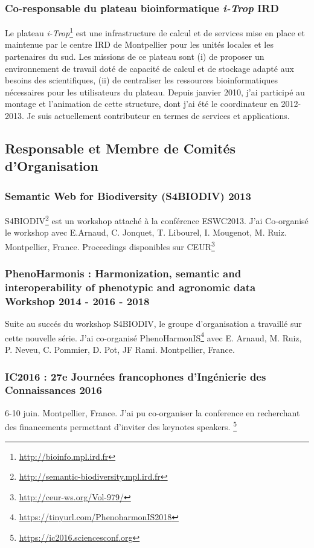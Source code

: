 \subsubsection*{Co-responsable du plateau bioinformatique \textit{i-Trop} IRD} 
Le plateau  \textit{i-Trop}\footnote{\url{http://bioinfo.mpl.ird.fr}} est une infrastructure de calcul et de services mise en place et maintenue par le centre IRD de Montpellier pour les unités locales et les partenaires du sud. Les missions de ce plateau sont (i) de proposer un environnement de travail doté de capacité de calcul et de stockage adapté aux besoins des scientifiques, (ii) de centraliser les ressources bioinformatiques nécessaires pour les utilisateurs du plateau. Depuis janvier 2010, j’ai participé au montage et l’animation de cette structure, dont j’ai été le coordinateur en 2012-2013. Je suis actuellement contributeur en termes de services et applications.


\subsection*{Responsable et Membre de Comités d’Organisation}

\subsubsection*{Semantic Web for Biodiversity (S4BIODIV) 2013 } 
S4BIODIV\footnote{\url{http://semantic-biodiversity.mpl.ird.fr}} est un workshop attaché à la conférence ESWC2013. J'ai Co-organisé le workshop avec E.Arnaud, C. Jonquet, T. Libourel, I. Mougenot, M. Ruiz. Montpellier, France.  Proceedings disponibles sur CEUR\footnote{\url{http://ceur-ws.org/Vol-979/}}

\subsubsection*{PhenoHarmonis : Harmonization, semantic and interoperability of phenotypic and agronomic data Workshop 2014 - 2016 - 2018} Suite au succés du workshop S4BIODIV, le groupe d'organisation a travaillé sur cette nouvelle série.  J'ai co-organisé PhenoHarmonIS\footnote{\url{https://tinyurl.com/PhenoharmonIS2018}} avec E. Arnaud, M. Ruiz, P. Neveu, C. Pommier, D. Pot, JF Rami. Montpellier, France.


\subsubsection*{IC2016 : 27e Journées francophones d'Ingénierie des Connaissances  2016 } 6-10 juin. Montpellier, France.  J'ai pu co-organiser la conference en recherchant des financements permettant d'inviter des keynotes speakers. 
 \footnote{\url{https://ic2016.sciencesconf.org}}


